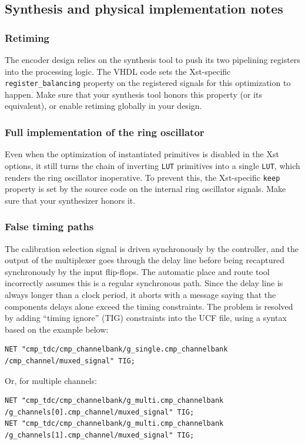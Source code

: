 \documentclass[a4paper,11pt]{article}
\begin{document}
\subsection{Synthesis and physical implementation notes}
\subsubsection{Retiming}
The encoder design relies on the synthesis tool to push its two pipelining registers into the processing logic. The VHDL code sets the Xst-specific \verb!register_balancing! property on the registered signals for this optimization to happen. Make sure that your synthesis tool honors this property (or its equivalent), or enable retiming globally in your design.

\subsubsection{Full implementation of the ring oscillator}
Even when the optimization of instantiated primitives is disabled in the Xst options, it still turns the chain of inverting \verb!LUT! primitives into a single \verb!LUT!, which renders the ring oscillator inoperative. To prevent this, the Xst-specific \verb!keep! property is set by the source code on the internal ring oscillator signals. Make sure that your synthesizer honors it.

\subsubsection{False timing paths}
The calibration selection signal is driven synchronously by the controller, and the output of the multiplexer goes through the delay line before being recaptured synchronously by the input flip-flops. The automatic place and route tool incorrectly assumes this is a regular synchronous path. Since the delay line is always longer than a clock period, it aborts with a message saying that the components delays alone exceed the timing constraints. The problem is resolved by adding ``timing ignore'' (TIG) constraints into the UCF file, using a syntax based on the example below:
\begin{verbatim}
NET "cmp_tdc/cmp_channelbank/g_single.cmp_channelbank
/cmp_channel/muxed_signal" TIG;
\end{verbatim}

Or, for multiple channels:
\begin{verbatim}
NET "cmp_tdc/cmp_channelbank/g_multi.cmp_channelbank
/g_channels[0].cmp_channel/muxed_signal" TIG;
NET "cmp_tdc/cmp_channelbank/g_multi.cmp_channelbank
/g_channels[1].cmp_channel/muxed_signal" TIG;
\end{verbatim}
\end{document}
